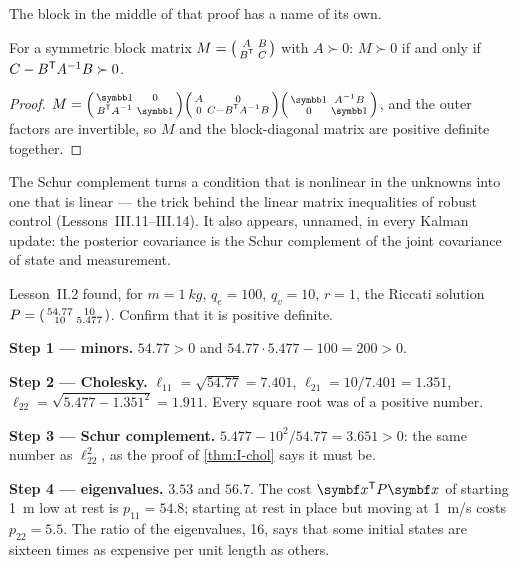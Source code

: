 The block in the middle of that proof has a name of its own.

\begin{theorem}
\label{thm:I-schur}
For a symmetric block matrix $M = \begin{psmallmatrix}A & B\\ B^{\mathsf{T}} & C\end{psmallmatrix}$ with $A \succ 0$: $M \succ 0$ if and only if $C - B^{\mathsf{T}} A^{-1}B \succ 0$.
\end{theorem}
\begin{proof}
$M = \begin{psmallmatrix}\Id & 0\\ B^\T A^{-1} & \Id\end{psmallmatrix}\begin{psmallmatrix}A & 0\\ 0 & C - B^\T A^{-1}B\end{psmallmatrix}\begin{psmallmatrix}\Id & A^{-1}B\\ 0 & \Id\end{psmallmatrix}$, and the outer factors are invertible, so $M$ and the block-diagonal matrix are positive definite together.
\end{proof}

The Schur complement turns a condition that is nonlinear in the unknowns into one that is linear — the trick behind the linear matrix inequalities of robust control (Lessons~III.11--III.14). It also appears, unnamed, in every Kalman update: the posterior covariance is the Schur complement of the joint covariance of state and measurement.

\begin{example}
\label{ex:I-P}
Lesson~II.2 found, for $m = \SI{1}{kg}$, $q_e = 100$, $q_v = 10$, $r = 1$, the Riccati solution $P = \begin{psmallmatrix}54.77 & 10\\ 10 & 5.477\end{psmallmatrix}$. Confirm that it is positive definite.

\textbf{Step 1 — minors.} $54.77 > 0$ and $54.77 \cdot 5.477 - 100 = 200 > 0$.

\textbf{Step 2 — Cholesky.} $\ell_{11} = \sqrt{54.77} = 7.401$, $\ell_{21} = 10/7.401 = 1.351$, $\ell_{22} = \sqrt{5.477 - 1.351^2} = 1.911$. Every square root was of a positive number.

\textbf{Step 3 — Schur complement.} $5.477 - 10^2/54.77 = 3.651 > 0$: the same number as $\ell_{22}^2$, as the proof of \cref{thm:I-chol} says it must be.

\textbf{Step 4 — eigenvalues.} $3.53$ and $56.7$. The cost $\vx^\T P\vx$ of starting \SI{1}{m} low at rest is $p_{11} = 54.8$; starting at rest in place but moving at \SI{1}{m/s} costs $p_{22} = 5.5$. The ratio of the eigenvalues, 16, says that some initial states are sixteen times as expensive per unit length as others.
\end{example}

